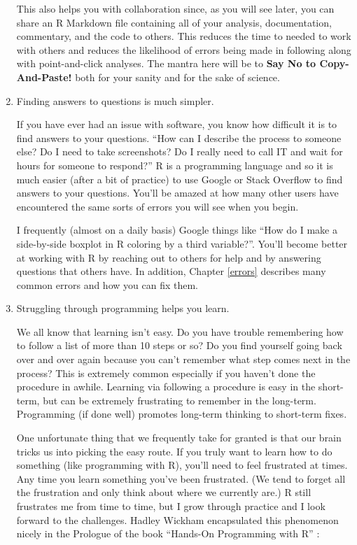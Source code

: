 \documentclass[]{tufte-book}
\begin{document}
\begin{enumerate}
  This also helps you with collaboration since, as you will see later,
  you can share an R Markdown file containing all of your analysis,
  documentation, commentary, and the code to others. This reduces the
  time to needed to work with others and reduces the likelihood of
  errors being made in following along with point-and-click analyses.
  The mantra here will be to \textbf{Say No to Copy-And-Paste!} both for
  your sanity and for the sake of science.
\item
  Finding answers to questions is much simpler.

  If you have ever had an issue with software, you know how difficult it
  is to find answers to your questions. ``How can I describe the process
  to someone else? Do I need to take screenshots? Do I really need to
  call IT and wait for hours for someone to respond?'' R is a
  programming language and so it is much easier (after a bit of
  practice) to use Google or Stack Overflow to find answers to your
  questions. You'll be amazed at how many other users have encountered
  the same sorts of errors you will see when you begin.

  I frequently (almost on a daily basis) Google things like ``How do I
  make a side-by-side boxplot in R coloring by a third variable?''.
  You'll become better at working with R by reaching out to others for
  help and by answering questions that others have. In addition, Chapter
  \ref{errors} describes many common errors and how you can fix them.
\item
  Struggling through programming helps you learn.

  We all know that learning isn't easy. Do you have trouble remembering
  how to follow a list of more than 10 steps or so? Do you find yourself
  going back over and over again because you can't remember what step
  comes next in the process? This is extremely common especially if you
  haven't done the procedure in awhile. Learning via following a
  procedure is easy in the short-term, but can be extremely frustrating
  to remember in the long-term. Programming (if done well) promotes
  long-term thinking to short-term fixes.

  One unfortunate thing that we frequently take for granted is that our
  brain tricks us into picking the easy route. If you truly want to
  learn how to do something (like programming with R), you'll need to
  feel frustrated at times. Any time you learn something you've been
  frustrated. (We tend to forget all the frustration and only think
  about where we currently are.) R still frustrates me from time to
  time, but I grow through practice and I look forward to the
  challenges. Hadley Wickham encapsulated this phenomenon nicely in the
  Prologue of the book ``Hands-On Programming with R''
  \citep{handson2014}:


\end{enumerate}
\end{document}
